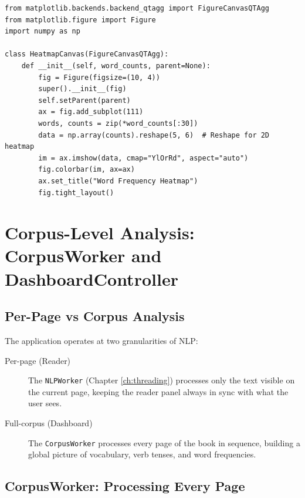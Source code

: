 \documentclass[12pt,oneside]{book}
\begin{document}
\begin{lstlisting}[caption={Embedding a matplotlib figure in a Qt widget (LLR-18)}]
from matplotlib.backends.backend_qtagg import FigureCanvasQTAgg
from matplotlib.figure import Figure
import numpy as np

class HeatmapCanvas(FigureCanvasQTAgg):
    def __init__(self, word_counts, parent=None):
        fig = Figure(figsize=(10, 4))
        super().__init__(fig)
        self.setParent(parent)
        ax = fig.add_subplot(111)
        words, counts = zip(*word_counts[:30])
        data = np.array(counts).reshape(5, 6)  # Reshape for 2D heatmap
        im = ax.imshow(data, cmap="YlOrRd", aspect="auto")
        fig.colorbar(im, ax=ax)
        ax.set_title("Word Frequency Heatmap")
        fig.tight_layout()
\end{lstlisting}


\chapter{Corpus-Level Analysis: CorpusWorker and DashboardController}
\label{ch:corpus}

\section{Per-Page vs Corpus Analysis}

The application operates at two granularities of NLP:

\begin{description}
  \item[Per-page (Reader)] The \texttt{NLPWorker} (Chapter \ref{ch:threading})
    processes only the text visible on the current page, keeping the reader
    panel always in sync with what the user sees.
  \item[Full-corpus (Dashboard)] The \texttt{CorpusWorker} processes every
    page of the book in sequence, building a global picture of vocabulary,
    verb tenses, and word frequencies.
\end{description}

\section{CorpusWorker: Processing Every Page}
\end{document}
